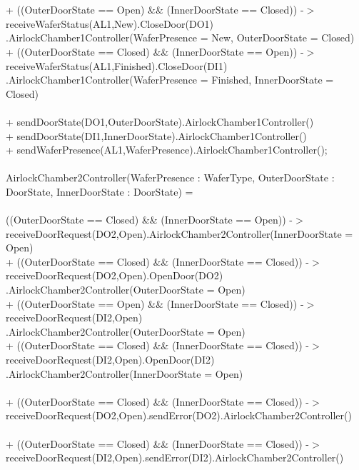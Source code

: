 \documentclass[a4paper,12pt]{article}
\begin{document}
	\\
	\\+ ((OuterDoorState == Open) \&\& (InnerDoorState == Closed)) -$>$ receiveWaferStatus(AL1,New).CloseDoor(DO1)
	\\.AirlockChamber1Controller(WaferPresence = New, OuterDoorState = Closed)
	\\+ ((OuterDoorState == Closed) \&\& (InnerDoorState == Open)) -$>$ receiveWaferStatus(AL1,Finished).CloseDoor(DI1)\\.AirlockChamber1Controller(WaferPresence = Finished, InnerDoorState = Closed)
	\\
	\\+ sendDoorState(DO1,OuterDoorState).AirlockChamber1Controller()
	\\+ sendDoorState(DI1,InnerDoorState).AirlockChamber1Controller()
	\\+ sendWaferPresence(AL1,WaferPresence).AirlockChamber1Controller();
	\\
	\\AirlockChamber2Controller(WaferPresence : WaferType, OuterDoorState : DoorState, InnerDoorState : DoorState) =
	\\
	\\((OuterDoorState == Closed) \&\& (InnerDoorState == Open)) -$>$ 
	\\receiveDoorRequest(DO2,Open).AirlockChamber2Controller(InnerDoorState = Open)
	\\+ ((OuterDoorState == Closed) \&\& (InnerDoorState == Closed)) -$>$ 
	\\receiveDoorRequest(DO2,Open).OpenDoor(DO2)
	\\.AirlockChamber2Controller(OuterDoorState = Open)
	\\+ ((OuterDoorState == Open) \&\& (InnerDoorState == Closed)) -$>$ \\receiveDoorRequest(DI2,Open)
	\\.AirlockChamber2Controller(OuterDoorState = Open)
	\\+ ((OuterDoorState == Closed) \&\& (InnerDoorState == Closed)) -$>$ 
	\\receiveDoorRequest(DI2,Open).OpenDoor(DI2)
	\\.AirlockChamber2Controller(InnerDoorState = Open)
	\\
	\\+ ((OuterDoorState == Closed) \&\& (InnerDoorState == Closed)) -$>$ receiveDoorRequest(DO2,Open).sendError(DO2).AirlockChamber2Controller()
	\\
	\\+ ((OuterDoorState == Closed) \&\& (InnerDoorState == Closed)) -$>$ receiveDoorRequest(DI2,Open).sendError(DI2).AirlockChamber2Controller()
\end{document}
